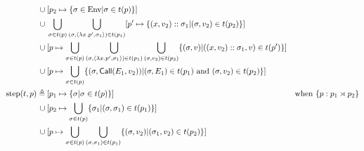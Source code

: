 \documentclass{article}
\begin{document}
\begin{align*}
	\cup                       & \: [p_2\mapsto\{\ctx\in\Ctx|\ctx\in \ptree(p)\}]                                                                                                                                                                                                                                                                     \\
	\cup                       & \: \bigcup_{\ctx\in \ptree(p)}\bigcup_{(\ctx,\langle\lambda x.p',\ctx_1\rangle)\in \ptree(p_1)}[p'\mapsto\{(x,v_2)\cons\ctx_1|(\ctx,v_2)\in \ptree(p_2)\}]                                                                                                                                                           \\
	\cup                       & \: [p\mapsto\bigcup_{\ctx\in \ptree(p)}\bigcup_{(\ctx,\langle\lambda x.p',\ctx_1\rangle)\in \ptree(p_1)}\bigcup_{(\ctx,v_2)\in \ptree(p_2)}\{(\ctx,v)|((x,v_2)\cons\ctx_1,v)\in \ptree(p')\}]                                                                                                                        \\
	\cup                       & \: [p\mapsto\bigcup_{\ctx\in \ptree(p)}\{(\ctx,\CallE(\event_1,v_2))|(\ctx,\event_1)\in \ptree(p_1)\text{ and }(\ctx,v_2)\in \ptree(p_2)\}]                                                                                                                                                                          \\
	\step(\ptree,p) \triangleq & \: [p_1\mapsto\{\ctx|\ctx\in \ptree(p)\}]                                                                                                                                                                                                         & \text{when }\plabel{p}{{p_1}\synlink{p_2}}                       \\
	\cup                       & \: [p_2\mapsto\bigcup_{\ctx\in \ptree(p)}\{\ctx_1|(\ctx,\ctx_1)\in \ptree(p_1)\}]                                                                                                                                                                                                                                    \\
	\cup                       & \: [p\mapsto\bigcup_{\ctx\in \ptree(p)}\bigcup_{(\ctx,\ctx_1)\in \ptree(p_1)}\{(\ctx,v_2)|(\ctx_1,v_2)\in \ptree(p_2)\}]                                                                                                                                                                                             \\

\end{align*}
\end{document}
